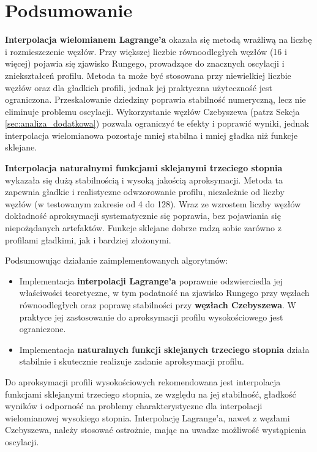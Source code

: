 \documentclass[11pt,a4paper]{article}
\begin{document}
\section{Podsumowanie}
\label{sec:podsumowanie}
\textbf{Interpolacja wielomianem Lagrange'a} okazała się metodą wrażliwą na liczbę i rozmieszczenie węzłów. Przy większej liczbie równoodległych węzłów (16 i więcej) pojawia się zjawisko Rungego, prowadzące do znacznych oscylacji i zniekształceń profilu. Metoda ta może być stosowana przy niewielkiej liczbie węzłów oraz dla gładkich profili, jednak jej praktyczna użyteczność jest ograniczona. Przeskalowanie dziedziny poprawia stabilność numeryczną, lecz nie eliminuje problemu oscylacji. Wykorzystanie węzłów Czebyszewa (patrz Sekcja \ref{sec:analiza_dodatkowa}) pozwala ograniczyć te efekty i poprawić wyniki, jednak interpolacja wielomianowa pozostaje mniej stabilna i mniej gładka niż funkcje sklejane.

\textbf{Interpolacja naturalnymi funkcjami sklejanymi trzeciego stopnia} wykazała się dużą stabilnością i wysoką jakością aproksymacji. Metoda ta zapewnia gładkie i realistyczne odwzorowanie profilu, niezależnie od liczby węzłów (w testowanym zakresie od 4 do 128). Wraz ze wzrostem liczby węzłów dokładność aproksymacji systematycznie się poprawia, bez pojawiania się niepożądanych artefaktów. Funkcje sklejane dobrze radzą sobie zarówno z profilami gładkimi, jak i bardziej złożonymi.
\vspace{1em}

Podsumowując działanie zaimplementowanych algorytmów:
\begin{itemize}
    \item Implementacja \textbf{interpolacji Lagrange'a} poprawnie odzwierciedla jej właściwości teoretyczne, w tym podatność na zjawisko Rungego przy węzłach równoodległych oraz poprawę stabilności przy \textbf{węzłach Czebyszewa}. W praktyce jej zastosowanie do aproksymacji profilu wysokościowego jest ograniczone.
    \item Implementacja \textbf{naturalnych funkcji sklejanych trzeciego stopnia} działa stabilnie i skutecznie realizuje zadanie aproksymacji profilu.
\end{itemize}

Do aproksymacji profili wysokościowych rekomendowana jest interpolacja funkcjami sklejanymi trzeciego stopnia, ze względu na jej stabilność, gładkość wyników i odporność na problemy charakterystyczne dla interpolacji wielomianowej wysokiego stopnia. Interpolację Lagrange'a, nawet z węzłami Czebyszewa, należy stosować ostrożnie, mając na uwadze możliwość wystąpienia oscylacji.
\end{document}
